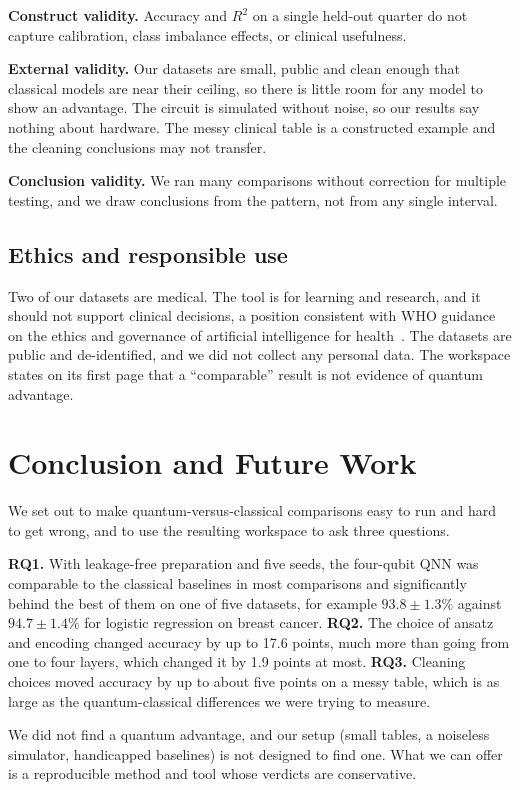\documentclass[conference]{IEEEtran}
\begin{document}
\textbf{Construct validity.} Accuracy and $R^2$ on a single held-out quarter do not capture calibration, class imbalance effects, or clinical usefulness.

\textbf{External validity.} Our datasets are small, public and clean enough that classical models are near their ceiling, so there is little room for any model to show an advantage. The circuit is simulated without noise, so our results say nothing about hardware. The messy clinical table is a constructed example and the cleaning conclusions may not transfer.

\textbf{Conclusion validity.} We ran many comparisons without correction for multiple testing, and we draw conclusions from the pattern, not from any single interval.

\subsection{Ethics and responsible use}
Two of our datasets are medical. The tool is for learning and research, and it should not support clinical decisions, a position consistent with WHO guidance on the ethics and governance of artificial intelligence for health~\cite{who2021ethics}. The datasets are public and de-identified, and we did not collect any personal data. The workspace states on its first page that a ``comparable'' result is not evidence of quantum advantage.

\section{Conclusion and Future Work}
We set out to make quantum-versus-classical comparisons easy to run and hard to get wrong, and to use the resulting workspace to ask three questions.

\textbf{RQ1.} With leakage-free preparation and five seeds, the four-qubit QNN was comparable to the classical baselines in most comparisons and significantly behind the best of them on one of five datasets, for example $93.8\pm1.3\%$ against $94.7\pm1.4\%$ for logistic regression on breast cancer. \textbf{RQ2.} The choice of ansatz and encoding changed accuracy by up to 17.6 points, much more than going from one to four layers, which changed it by 1.9 points at most. \textbf{RQ3.} Cleaning choices moved accuracy by up to about five points on a messy table, which is as large as the quantum-classical differences we were trying to measure.

We did not find a quantum advantage, and our setup (small tables, a noiseless simulator, handicapped baselines) is not designed to find one. What we can offer is a reproducible method and tool whose verdicts are conservative.
\end{document}
